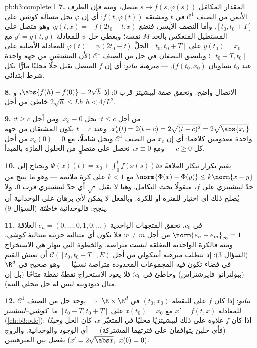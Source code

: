 \begin{solution}{pb:b3:complete:1}
\textbf{7.} المقدار المكامَل $s \mapsto f(s, \varphi(s))$ متصل، ومنه فإن الطرف
الأيمن من الصنف $\mathcal C^1$ في $t$ ومشتقه $f(t, \varphi(t))$: أي إن
$\varphi$ يحل مسألة كوشي على $[t_0, t_0 + T]$. وأما النصف
الأيسر، فنضع $g(t, x) =
-f(2t_0 - t, x)$، وهو متصل على المستطيل المنعكس بالحد $M$
نفسه؛ ويعطي حل $\psi$ للمعادلة $y' = g(t,y)$ مع $y(t_0) = x_0$
على $[t_0, t_0 + T]$ الحلَّ $\varphi(t) =
\psi(2t_0 - t)$ للمعادلة الأصلية على
$[t_0 - T,
t_0]$؛ ويلتصق النصفان في حل من الصنف $\mathcal C^1$ (لأن
المشتقين من جهة واحدة عند $t_0$ يساويان $f(t_0, x_0)$). ---
\emph{مبرهنة بيانو}: أي إن $f$ المتصل يقبل حلًّا محليًا مارًّا
بكل شرط ابتدائي.

\textbf{8.} الاتصال واضح. وتخفق صفة ليبشيتز قرب $0$: إذ $\abs{f(h) - f(0)} = 2\sqrt h$،
و $2\sqrt h \leq L h$ خاطئ من أجل $h < 4/L^2$.

\textbf{9.} من أجل $t \leq c$: يحل $x_c \equiv 0$. ومن أجل
$t \geq
c$: $x_c'(t) = 2(t - c) = 2\sqrt{(t-c)^2} = 2\sqrt{\abs{x_c}}$. وعند $t = c$ يكون المشتقان من جهة واحدة
معدومين كلاهما: أي إن $x_c$ من الصنف $\mathcal C^1$ ويحل شاملًا،
مع $x_c(0) = 0$ من أجل كل $c \geq 0$ --- ومع $x \equiv 0$،
نحصل على متصلٍ من الحلول المارّة بالمبدأ.

\textbf{10.} يقيم تكرار بيكار العلاقةَ $\Phi(x)(t) = x_0 +
\int_0^t f(x(s))\dd s$ ويحتاج إلى
$\norm{\Phi(x) - \Phi(y)}
\leq k\norm{x - y}$ مع $k < 1$ على كرة ملائمة --- وهو ما ينتج من حدّ
ليبشيتزي على $f$، منقولًا تحت التكامل. وهنا لا يقبل $\sqrt\cdot$
أي حدّ ليبشيتزي قرب $0$، ولا يُصلح ذلك أي اختيار للفترة أو
للكرة. وبالفعل لا يمكن لأي برهان على الوحدانية أن ينجح:
فالوحدانية \emph{خاطئة} (السؤال 9).

\textbf{11.} في $c_0$، تحقق المتجهات الواحدية $e_n = (0, \dots, 0, 1,
0, \dots)$ العلاقةَ
$\norm{e_n - e_m}_\infty = 1$ من أجل $n \neq
m$: فلا تكون أي متتالية جزئية متتاليةَ
كوشي، ومنه فالكرة الواحدية المغلقة ليست متراصة. والخطوة التي
تنهار هي الاستخراج (السؤال 3): إذ تتطلب مبرهنة أسكولي من أجل
$\mathcal C([t_0, t_0+T], E)$ أن تعيش القيم في فضاء تكون فيه المجموعات المحدودة
متراصة نسبيًا --- وهو صحيح في $\R^d$ (ببولتزانو--فايرشتراس)
وخاطئ في $c_0$؛ فلا يعود الاستخراج نقطةً نقطة متاحًا (بل إن
مثال ديودونيه ليس له حل محلي البتة).

\textbf{12.} \emph{بيانو}: إذا كان $f$  على  للنقطة
$(t_0, x_0)$ في $\R\times\R^d$ $\Rightarrow$ يوجد حل من الصنف
$\mathcal C^1$ للمعادلة $x' = f(t,x)$ مع $x(t_0) = x_0$ على
$[t_0 - T, t_0 + T]$ ما. \emph{كوشي--ليبشيتز} (\cref{ch:b3:ode}): إذا كان $f$
علاوة على ذلك ليبشيتزيًا محليًا في المتغيّر $x$، كان الحل
\emph{وحيدًا} (فأي حلين يتوافقان على فترتهما المشتركة) --- أي
الوجود والوحدانية. والزوج $(x' = 2\sqrt{\abs x},\ x(0) = 0)$ يفصل بين المبرهنتين.


\end{solution}
